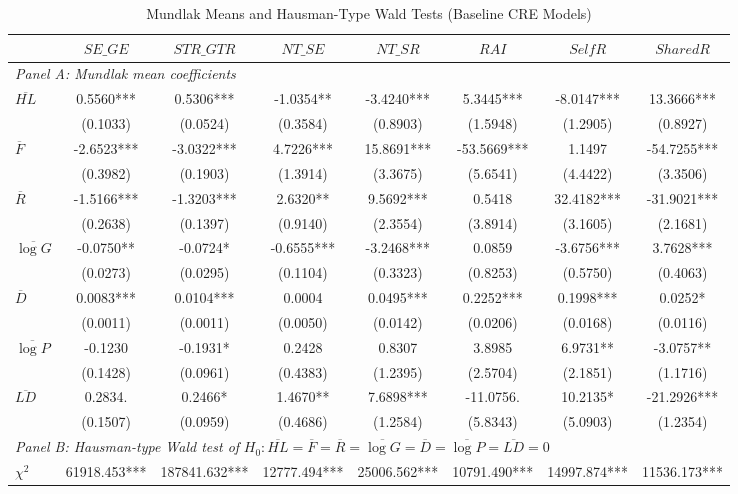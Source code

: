 \begin{table}[!htbp]
\centering
\caption{Mundlak Means and Hausman-Type Wald Tests (Baseline CRE Models)}
\label{tab:mundlak_hausman_baseline}
\scriptsize
\setlength{\tabcolsep}{4pt}
\begin{tabular}{lccccccc}
\hline
 & $SE\_GE$ & $STR\_GTR$ & $NT\_SE$ & $NT\_SR$ & $RAI$ & $SelfR$ & $SharedR$ \\
\hline
\multicolumn{8}{l}{\textit{Panel A: Mundlak mean coefficients}} \\
$\overline{HL}$ & 0.5560*** & 0.5306*** & -1.0354** & -3.4240*** & 5.3445*** & -8.0147*** & 13.3666*** \\
 & (0.1033) & (0.0524) & (0.3584) & (0.8903) & (1.5948) & (1.2905) & (0.8927) \\
$\overline{F}$ & -2.6523*** & -3.0322*** & 4.7226*** & 15.8691*** & -53.5669*** & 1.1497 & -54.7255*** \\
 & (0.3982) & (0.1903) & (1.3914) & (3.3675) & (5.6541) & (4.4422) & (3.3506) \\
$\overline{R}$ & -1.5166*** & -1.3203*** & 2.6320** & 9.5692*** & 0.5418 & 32.4182*** & -31.9021*** \\
 & (0.2638) & (0.1397) & (0.9140) & (2.3554) & (3.8914) & (3.1605) & (2.1681) \\
$\overline{\log G}$ & -0.0750** & -0.0724* & -0.6555*** & -3.2468*** & 0.0859 & -3.6756*** & 3.7628*** \\
 & (0.0273) & (0.0295) & (0.1104) & (0.3323) & (0.8253) & (0.5750) & (0.4063) \\
$\overline{D}$ & 0.0083*** & 0.0104*** & 0.0004 & 0.0495*** & 0.2252*** & 0.1998*** & 0.0252* \\
 & (0.0011) & (0.0011) & (0.0050) & (0.0142) & (0.0206) & (0.0168) & (0.0116) \\
$\overline{\log P}$ & -0.1230 & -0.1931* & 0.2428 & 0.8307 & 3.8985 & 6.9731** & -3.0757** \\
 & (0.1428) & (0.0961) & (0.4383) & (1.2395) & (2.5704) & (2.1851) & (1.1716) \\
$\overline{LD}$ & 0.2834. & 0.2466* & 1.4670** & 7.6898*** & -11.0756. & 10.2135* & -21.2926*** \\
 & (0.1507) & (0.0959) & (0.4686) & (1.2584) & (5.8343) & (5.0903) & (1.2354) \\
\hline
\multicolumn{8}{l}{\textit{Panel B: Hausman-type Wald test of } $H_0: \overline{HL}=\overline{F}=\overline{R}=\overline{\log G}=\overline{D}=\overline{\log P}=\overline{LD}=0$} \\
$\chi^2$ & 61918.453*** & 187841.632*** & 12777.494*** & 25006.562*** & 10791.490*** & 14997.874*** & 11536.173*** \\

\end{tabular}
\end{table}
